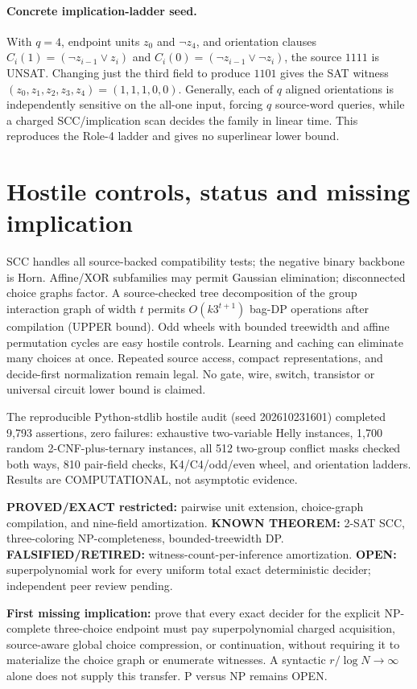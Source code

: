 \documentclass[10pt]{article}
\begin{document}
\paragraph{Concrete implication-ladder seed.}
With $q=4$, endpoint units $z_0$ and $\neg z_4$, and orientation clauses
$C_i(1)=(\neg z_{i-1}\lor z_i)$ and
$C_i(0)=(\neg z_{i-1}\lor\neg z_i)$, the source $1111$ is UNSAT.
Changing just the third field to produce $1101$ gives the SAT witness
$(z_0,z_1,z_2,z_3,z_4)=(1,1,1,0,0)$.
Generally, each of $q$ aligned orientations is independently sensitive
on the all-one input, forcing $q$ source-word queries, while a charged
SCC/implication scan decides the family in linear time.
This reproduces the Role-4 ladder and gives no superlinear lower bound.

\section{Hostile controls, status and missing implication}
SCC handles all source-backed compatibility tests; the negative binary backbone is Horn. Affine/XOR subfamilies may permit Gaussian elimination; disconnected choice graphs factor. A source-checked tree decomposition of the group interaction graph of width $t$ permits $O(k3^{t+1})$ bag-DP operations after compilation (UPPER bound). Odd wheels with bounded treewidth and affine permutation cycles are easy hostile controls. Learning and caching can eliminate many choices at once. Repeated source access, compact representations, and decide-first normalization remain legal. No gate, wire, switch, transistor or universal circuit lower bound is claimed.

The reproducible Python-stdlib hostile audit (seed 202610231601) completed 9,793 assertions, zero failures: exhaustive two-variable Helly instances, 1,700 random 2-CNF-plus-ternary instances, all 512 two-group conflict masks checked both ways, 810 pair-field checks, K4/C4/odd/even wheel, and orientation ladders. Results are COMPUTATIONAL, not asymptotic evidence.

\noindent\textbf{PROVED/EXACT restricted:} pairwise unit extension, choice-graph compilation, and nine-field amortization. \textbf{KNOWN THEOREM:} 2-SAT SCC, three-coloring NP-completeness, bounded-treewidth DP. \textbf{FALSIFIED/RETIRED:} witness-count-per-inference amortization. \textbf{OPEN:} superpolynomial work for every uniform total exact deterministic decider; independent peer review pending.

\noindent\textbf{First missing implication:}
prove that every exact decider for the explicit NP-complete three-choice endpoint must pay superpolynomial charged acquisition, source-aware global choice compression, or continuation, without requiring it to materialize the choice graph or enumerate witnesses. A syntactic $r/\log N\to\infty$ alone does not supply this transfer. P versus NP remains OPEN.
\end{document}
